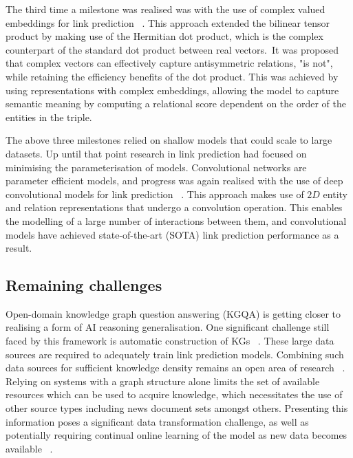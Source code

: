\noindent The third time a milestone was realised was with the use of complex valued embeddings for link prediction \unskip~\citep{trouillon2016complex}. This approach extended the bilinear tensor product by making use of the Hermitian dot product, which is the complex counterpart of the standard dot product between real vectors.\ It was proposed that complex vectors can effectively capture antisymmetric relations, "is not", while retaining the efficiency benefits of the dot product. This was achieved by using representations with complex embeddings, allowing the model to capture semantic meaning by computing a relational score dependent on the order of the entities in the triple. \par
 
\noindent The above three milestones relied on shallow models that could scale to large datasets. Up until that point research in link prediction had focused on minimising the parameterisation of models. Convolutional networks are parameter efficient models, and progress was again realised with the use of deep convolutional models for link prediction \unskip~\citep{dettmers2018convolutional}. This approach makes use of $ 2D $ entity and relation representations that undergo a convolution operation. This enables the modelling of a large number of interactions between them, and convolutional models have achieved state-of-the-art (SOTA) link prediction performance as a result. \par

\subsection{Remaining challenges}

\noindent Open-domain knowledge graph question answering (KGQA) is getting closer to realising a form of AI reasoning generalisation. One significant challenge still faced by this framework is automatic construction of KGs \unskip~\citep{dong2014knowledge}. These large data sources are required to adequately train link prediction models. Combining such data sources for sufficient knowledge density remains an open area of research \unskip~\citep{diefenbach2018wdaqua}. Relying on systems with a graph structure alone limits the set of available resources which can be used to acquire knowledge, which necessitates the use of other source types including news document sets amongst others. Presenting this information poses a significant data transformation challenge, as well as potentially requiring continual online learning of the model as new data becomes available \unskip~\citep{abujabal2018never}. \par

